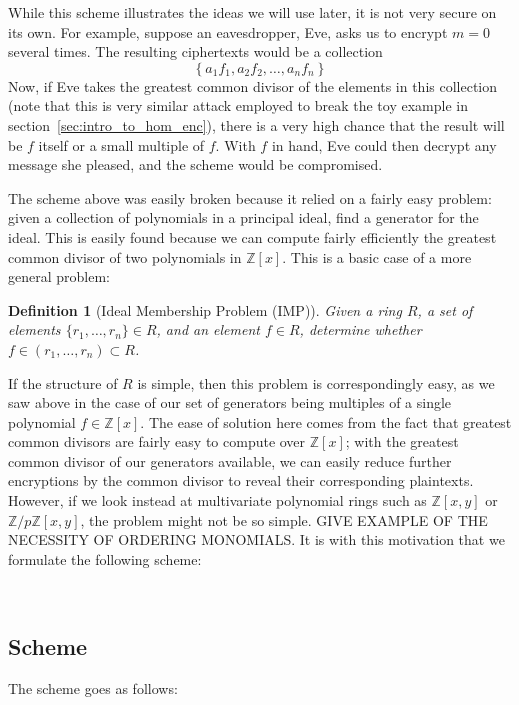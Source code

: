 \documentclass[11pt]{report}
\newtheorem{definition}{Definition}
\newcommand{\Z}{\mathbb{Z}}
\newcommand{\Zx}{\mathbb{Z}[x]}
\newcommand{\Zxy}{\mathbb{Z}[x,y]}
\newcommand{\Zpxy}{\mathbb{Z}/p\mathbb{Z}[x,y]}
\begin{document}
While this scheme illustrates the ideas we will use later, it is not very secure on its own. For example, suppose an eavesdropper, Eve, asks us to encrypt $m=0$ several times. The resulting ciphertexts would be a collection
\[\left\{ a_1f_1, a_2f_2,\dots ,a_nf_n\right\}\]
Now, if Eve takes the greatest common divisor of the elements in this collection (note that this is very similar attack employed to break the toy example in section~\ref{sec:intro_to_hom_enc}), there is a very high chance that the result will be $f$ itself or a small multiple of $f$. With $f$ in hand, Eve could then decrypt any message she pleased, and the scheme would be compromised.

The scheme above was easily broken because it relied on a fairly easy problem: given a collection of polynomials in a principal ideal, find a generator for the ideal. This is easily found because we can compute fairly efficiently the greatest common divisor of two polynomials in $\Z[x]$. This is a basic case of a more general problem:

\begin{definition}[Ideal Membership Problem (IMP)]
Given a ring $R$, a set of elements $\{r_1,\dots,r_n\}\in R$, and an element $f\in R$, determine whether $f\in (r_1,\dots,r_n) \subset R$.
\end{definition}

If the structure of $R$ is simple, then this problem is correspondingly easy, as we saw above in the case of our set of generators being multiples of a single polynomial $f\in \Zx$. The ease of solution here comes from the fact that greatest common divisors are fairly easy to compute over $\Zx$; with the greatest common divisor of our generators available, we can easily reduce further encryptions by the common divisor to reveal their corresponding plaintexts. However, if we look instead at multivariate polynomial rings such as $\Zxy$ or $\Zpxy$, the problem might not be so simple. GIVE EXAMPLE OF THE NECESSITY OF ORDERING MONOMIALS. It is with this motivation that we formulate the following scheme:

\

\subsection{Scheme}
\label{sec:mv_scheme}

The scheme goes as follows:
\end{document}
